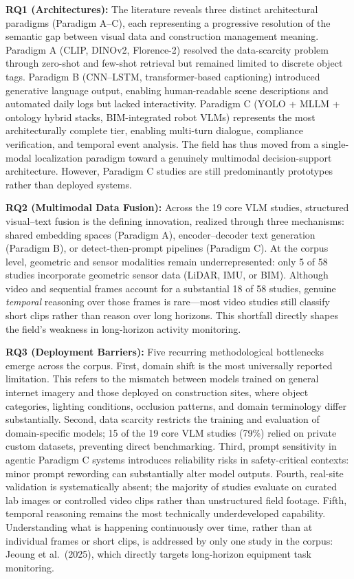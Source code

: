 \documentclass[10pt,letterpaper]{article}
\begin{document}
\textbf{RQ1 (Architectures):} The literature reveals three distinct architectural paradigms (Paradigm A--C), each representing a progressive resolution of the semantic gap between visual data and construction management meaning. Paradigm A (CLIP, DINOv2, Florence-2) resolved the data-scarcity problem through zero-shot and few-shot retrieval but remained limited to discrete object tags. Paradigm B (CNN--LSTM, transformer-based captioning) introduced generative language output, enabling human-readable scene descriptions and automated daily logs but lacked interactivity. Paradigm C (YOLO + MLLM + ontology hybrid stacks, BIM-integrated robot VLMs) represents the most architecturally complete tier, enabling multi-turn dialogue, compliance verification, and temporal event analysis. The field has thus moved from a single-modal localization paradigm toward a genuinely multimodal decision-support architecture. However, Paradigm C studies are still predominantly prototypes rather than deployed systems.

\textbf{RQ2 (Multimodal Data Fusion):} Across the 19 core VLM studies, structured visual--text fusion is the defining innovation, realized through three mechanisms: shared embedding spaces (Paradigm A), encoder--decoder text generation (Paradigm B), or detect-then-prompt pipelines (Paradigm C). At the corpus level, geometric and sensor modalities remain underrepresented: only 5 of 58 studies incorporate geometric sensor data (LiDAR, IMU, or BIM). Although video and sequential frames account for a substantial 18 of 58 studies, genuine \emph{temporal} reasoning over those frames is rare---most video studies still classify short clips rather than reason over long horizons. This shortfall directly shapes the field's weakness in long-horizon activity monitoring.

\textbf{RQ3 (Deployment Barriers):} Five recurring methodological bottlenecks emerge across the corpus. First, domain shift is the most universally reported limitation. This refers to the mismatch between models trained on general internet imagery and those deployed on construction sites, where object categories, lighting conditions, occlusion patterns, and domain terminology differ substantially. Second, data scarcity restricts the training and evaluation of domain-specific models; 15 of the 19 core VLM studies (79\%) relied on private custom datasets, preventing direct benchmarking. Third, prompt sensitivity in agentic Paradigm C systems introduces reliability risks in safety-critical contexts: minor prompt rewording can substantially alter model outputs. Fourth, real-site validation is systematically absent; the majority of studies evaluate on curated lab images or controlled video clips rather than unstructured field footage. Fifth, temporal reasoning remains the most technically underdeveloped capability. Understanding what is happening continuously over time, rather than at individual frames or short clips, is addressed by only one study in the corpus: Jeoung et al.\ (2025), which directly targets long-horizon equipment task monitoring.
\end{document}
